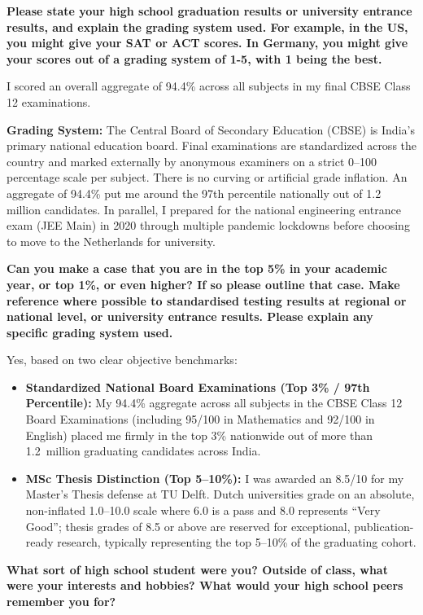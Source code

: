 \documentclass[letterpaper,11pt]{article}
\newcommand{\interviewQuestion}[1]{%
  \vspace{8pt}%
  \textbf{\color{airforceblue}#1}\par%
}
\begin{document}
\interviewQuestion{Please state your high school graduation results or university entrance results, and explain the grading system used. For example, in the US, you might give your SAT or ACT scores. In Germany, you might give your scores out of a grading system of 1-5, with 1 being the best.}

I scored an overall aggregate of 94.4\% across all subjects in my final CBSE Class 12 examinations.

\textbf{Grading System:} The Central Board of Secondary Education (CBSE) is India's primary national education board. Final examinations are standardized across the country and marked externally by anonymous examiners on a strict 0--100 percentage scale per subject. There is no curving or artificial grade inflation. An aggregate of 94.4\% put me around the 97th percentile nationally out of 1.2 million candidates. In parallel, I prepared for the national engineering entrance exam (JEE Main) in 2020 through multiple pandemic lockdowns before choosing to move to the Netherlands for university.

\interviewQuestion{Can you make a case that you are in the top 5\% in your academic year, or top 1\%, or even higher? If so please outline that case. Make reference where possible to standardised testing results at regional or national level, or university entrance results. Please explain any specific grading system used.}

Yes, based on two clear objective benchmarks:
\begin{itemize}[leftmargin=0.2in, itemsep=3pt]
    \item \textbf{Standardized National Board Examinations (Top 3\% / 97th Percentile):} My 94.4\% aggregate across all subjects in the CBSE Class 12 Board Examinations (including 95/100 in Mathematics and 92/100 in English) placed me firmly in the top 3\% nationwide out of more than 1.2~million graduating candidates across India.
    \item \textbf{MSc Thesis Distinction (Top 5--10\%):} I was awarded an 8.5/10 for my Master's Thesis defense at TU Delft. Dutch universities grade on an absolute, non-inflated 1.0--10.0 scale where 6.0 is a pass and 8.0 represents ``Very Good''; thesis grades of 8.5 or above are reserved for exceptional, publication-ready research, typically representing the top 5--10\% of the graduating cohort.
\end{itemize}

\interviewQuestion{What sort of high school student were you? Outside of class, what were your interests and hobbies? What would your high school peers remember you for?}
\end{document}
